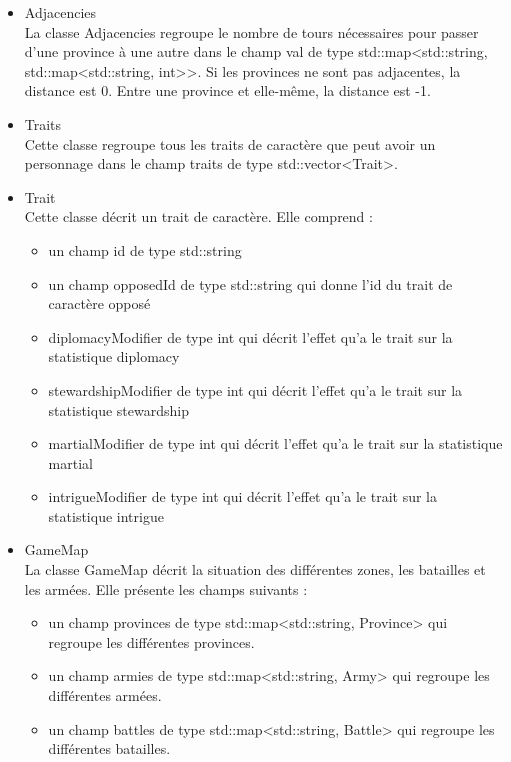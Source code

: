 \documentclass[a4paper,12pt]{article}
\begin{document}
\begin{itemize}
\item Adjacencies\\
La classe Adjacencies regroupe le nombre de tours nécessaires pour passer d'une province à une autre dans le champ val de type std::map<std::string, std::map<std::string, int>>. Si les provinces ne sont pas adjacentes, la distance est 0. Entre une province et elle-même, la distance est -1.\\

\item Traits\\
Cette classe regroupe tous les traits de caractère que peut avoir un personnage dans le champ traits de type std::vector<Trait>.
\item Trait\\
Cette classe décrit un trait de caractère. Elle comprend :
\begin{itemize}
\item un champ id de type std::string
\item un champ opposedId de type std::string qui donne l'id du trait de caractère opposé
\item diplomacyModifier de type int qui décrit l'effet qu'a le trait sur la statistique diplomacy
\item stewardshipModifier de type int qui décrit l'effet qu'a le trait sur la statistique stewardship
\item martialModifier de type int qui décrit l'effet qu'a le trait sur la statistique martial
\item intrigueModifier de type int qui décrit l'effet qu'a le trait sur la statistique intrigue\\
\end{itemize}

\item GameMap\\
La classe GameMap décrit la situation des différentes zones, les batailles et les armées. 
Elle présente les champs suivants :
\begin{itemize}
\item un champ provinces de type std::map<std::string, Province> qui regroupe les différentes provinces.
\item un champ armies de type std::map<std::string, Army> qui regroupe les différentes armées.
\item un champ battles de type std::map<std::string, Battle> qui regroupe les différentes batailles.\\
\end{itemize} 


\end{itemize}
\end{document}
